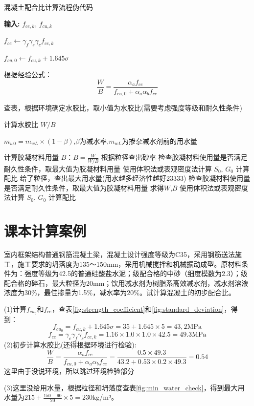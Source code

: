\documentclass[12pt, a4paper, oneside, UTF8]{ctexbook}
\begin{document}
\begin{algorithm}[H]
\caption{混凝土配合比计算流程伪代码}
\begin{algorithmic}[1]

\State \textbf{输入:} $f_{ce,k}$, $f_{cu,k}$

\State $f_{ce} \gets \gamma_f \gamma_s \gamma_c f_{ce,k}$

\State $f_{cu,0} \gets f_{cu,k} + 1.645\sigma$ 

\State 根据经验公式：
\[
\frac{W}{B} = \frac{\alpha_a f_{ce}}{f_{cu,0} + \alpha_a \alpha_b f_{ce}}
\]

\State 查表，根据环境确定水胶比，取小值为水胶比(需要考虑强度等级和耐久性条件)

\State 计算水胶比 $W/B$

	\State $m_{w0}=m_{wL} \times (1 - \beta)$,$\beta$为减水率,$m_{wL}$为掺杂减水剂前的用水量
\EndIf

	\State 计算胶凝材料用量 $B$：$B = \frac{W}{W/B}$
	\State 根据粒径查出砂率
	\State 检查胶凝材料使用量是否满足耐久性条件，取最大值为胶凝材料用量
	\State 使用体积法或表观密度法计算 $S_0$, $G_0$
	\State 计算配比
	\Else
	\State 给了粒径，查出最大用水量(用水越多经济性越好23333)
	\State 检查胶凝材料使用量是否满足耐久性条件，取最大值为胶凝材料用量
	\State 求得$W$,$B$
	\State 使用体积法或表观密度法计算 $S_0$, $G_0$
	\State 计算配比
\EndIf

\end{algorithmic}
\end{algorithm}

\section{课本计算案例}

\begin{example}
	室内框架结构普通钢筋混凝土梁，混凝土设计强度等级为C35，采用钢筋送法施工，施工要求的坍落度为135～150mm，采用机械搅拌和机械振动成型。原材料条件为：强度等级为42.5的普通硅酸盐水泥；级配合格的中砂（细度模数为2.3）；级配合格的碎石，最大粒径为20mm；饮用减水剂为树脂系高效减水剂，减水剂溶液浓度为30\%，最佳掺量为1.5\%，减水率为20\%。试计算混凝土的初步配合比。

	(1)计算$f_{cu_0}$和$f_{ce}$，查表\ref{fig:strength_coefficient}和\ref{fig:standard_deviation}，得到：
	\[
	f_{cu_0} = f_{cu,k} + 1.645\sigma = 35 + 1.645 \times 5 = 43,2 \text{MPa}
	\]
	\[
	f_{ce} = \gamma_c \gamma_f \gamma_s f_{ce,k} = 1.16 \times 1.0 \times 1.0 \times 42.5 = 49.3 \text{MPa} 
	\]
	(2)初步计算水胶比(还得根据环境进行检验):
	\[
	\frac{W}{B} = \frac{\alpha_a f_{ce}}{f_{cu,0} + \alpha_a \alpha_b f_{ce}} = \frac{0.5 \times 49.3}{43.2 + 0.53 \times 0.2 \times 49.3} = 0.54
	\]
	这里由于没说环境，所以跳过环境检验部分

	(3)这里没给用水量，根据粒径和坍落度查表\ref{fig:min_water_check}，得到最大用水量为$215+\frac{150-90}{20}\times 5 = 230$kg/m³。

\end{example}
\end{document}
